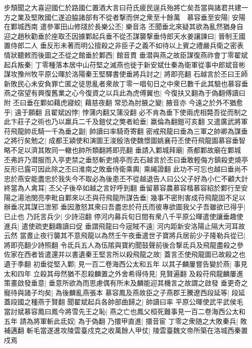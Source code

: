 步頹聞之大喜迎國仁於路國仁置酒大言曰苻氏疲民逞兵殆將亡矣吾當與諸君共建一方之業及堅敗國仁遂迫脇諸部有不從者撃而併之衆至十餘萬　慕容垂至安陽|{
	安陽在鄴城西南}
遣參軍田山修牋於長樂公丕|{
	樂音洛}
丕聞垂北來疑其欲為亂然猶身自迎之趙秋勸垂於座取丕因據鄴起兵垂不從丕謀襲撃垂侍郎天水姜讓諫曰|{
	晉制王國置侍郎二人}
垂反形未著而明公擅殺之非臣子之義不如待以上賓之禮嚴兵衛之密表情狀聽敕而後圖之丕從之館垂於鄴西|{
	館音貫}
垂潜與燕之故臣謀復燕祚會丁零翟斌起兵叛秦|{
	丁零種落本居中山苻堅之滅燕也徙于新安斌仕秦為衛軍從事中郎斌音彬}
謀攻豫州牧平原公暉於洛陽秦王堅驛書使垂將兵討之|{
	將即亮翻}
石越言於丕曰王師新敗民心未安負罪亡匿之徒思亂者衆故丁零一唱旬日之中衆已數千此其驗也慕容垂燕之宿望有興復舊業之心今復資之以兵此為虎傅翼也|{
	今復扶又翻為于偽翻傅讀曰附}
丕曰垂在鄴如藉虎寢蛟|{
	藉慈夜翻}
常恐為肘腋之變|{
	腋音亦}
今遠之於外不猶愈乎|{
	遠于願翻}
且翟斌凶悖|{
	悖蒲内翻又蒲没翻}
必不肯為垂下使兩虎相斃吾從而制之此卞莊子之術也乃以羸兵二千及鎧仗之獘者給垂|{
	羸倫為翻鎧可亥翻}
又遣廣武將軍苻飛龍帥氐騎一千為垂之副|{
	帥讀曰率騎奇寄翻}
密戒飛龍曰垂為三軍之帥卿為謀垂之將行矣勉之|{
	成都王潁使和演圖王浚殷浩使魏憬圖姚襄苻丕使苻飛龍圖慕容垂智略不足以濟其敗同一轍也帥所類翻將即亮翻}
垂請入鄴城拜廟|{
	燕都鄴故廟在鄴城}
丕弗許乃潜服而入亭吏禁之垂怒斬吏燒亭而去石越言於丕曰垂敢輕侮方鎮殺吏燒亭反形已露可因此除之丕曰淮南之敗垂侍衛乘輿|{
	乘䋲證翻}
此功不可忘也越曰垂尚不忠於燕安能盡忠於我失今不取必為後患丕不從越退告人曰公父子好為小仁不顧大計終當為人禽耳|{
	丕父子後卒如越之言好呼到翻}
垂留慕容農慕容楷慕容紹於鄴行至安陽之湯池閔亮李毗自鄴來以丕與苻飛龍所謀告垂|{
	幾事不密則害成苻飛龍固不足以辦垂况其謀已泄邪}
垂因激怒其衆曰吾盡忠於苻氏而彼專欲圖我父子吾雖欲已得乎|{
	已止也}
乃託言兵少|{
	少詩沼翻}
停河内募兵旬日間有衆八千平原公暉遣使讓垂趣使進兵|{
	遣使疏吏翻趣讀曰促}
垂謂飛龍曰今宼賊不遠|{
	河内距新安洛陽止隔大河耳故云然}
當晝止夜行襲其不意飛龍以為然壬午夜垂遣世子寶將兵居前少子隆勒兵從已|{
	將即亮翻少詩照翻}
令氐兵五人為伍隂與寶約聞鼓聲前後合撃氐兵及飛龍盡殺之參佐家在西者皆遣還并以書遺秦王堅言所以殺飛龍之故|{
	蓋言丕使飛龍圖已故殺之也遺于季翻}
初垂從堅入鄴|{
	見一百二卷海西公太和五年}
以其子麟屢嘗告變於燕|{
	事見太和四年}
立殺其母然猶不忍殺麟置之外舍希得侍見|{
	見賢遍翻}
及殺苻飛龍麟屢進策畫啟發垂意|{
	垂意所欲為而思慮偶有所未及麟能迎其機言之故謂之啟發}
垂更奇之寵待與諸子均矣|{
	為後麟亂燕張本}
慕容鳳及燕故臣之子燕郡王騰遼西段延等|{
	段延蓋段國之種燕于賢翻}
聞翟斌起兵各帥部曲歸之|{
	帥讀曰率}
平原公暉使武平武侯毛當討斌慕容鳳曰鳳今將雪先王之恥|{
	燕之亡也鳳父桓死難事見一百二卷海西公太和五年}
請為將軍斬此氐奴|{
	為于偽翻}
乃擐甲直進|{
	擐音宦}
丁零之衆随之大敗秦兵|{
	敗補邁翻}
斬毛當遂進攻陵雲臺戍克之收萬餘人甲仗|{
	陵雲臺魏文帝所築在洛城西秦置戍焉}
